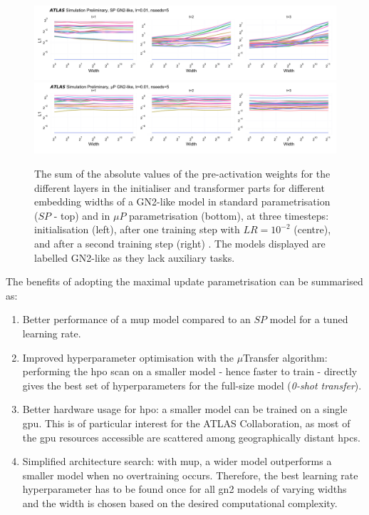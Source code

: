\begin{figure}[h!]
  \centering
  \includegraphics[width=\textwidth]{Images/FTAG/GN/HPO/spweights.png}\\
  \includegraphics[width=\textwidth]{Images/FTAG/GN/HPO/mupweights.png}
  \caption{The sum of the absolute values of the pre-activation weights for the different layers in the initialiser and transformer parts for different embedding widths of a GN2-like model in standard parametrisation ($SP$ - top) and in $\mu P$ parametrisation (bottom), at three timesteps: initialisation (left), after one training step with $LR = 10^{-2}$ (centre), and after a second training step (right) \cite{publicplotMUP}. The models displayed are labelled GN2-like as they lack auxiliary tasks.}
  \label{fig:muspweights}
\end{figure} 
\vspace{-0.3cm}
The benefits of adopting the maximal update parametrisation can be summarised as:
\begin{enumerate}
  \item Better performance of a \gls{mup} model compared to an $SP$ model for a tuned learning rate.
  \item Improved hyperparameter optimisation with the $\mu$Transfer algorithm: performing the \gls{hpo} scan on a smaller model - hence faster to train - directly gives the best set of hyperparameters for the full-size model (\textit{0-shot transfer}). 
  \item Better hardware usage for \gls{hpo}: a smaller model can be trained on a single \gls{gpu}. This is of particular interest for the ATLAS Collaboration, as most of the \gls{gpu} resources accessible are scattered among geographically distant \glspl{hpc}.  
  \item Simplified architecture search: with \gls{mup}, a wider model outperforms a smaller model when no overtraining occurs. Therefore, the best learning rate hyperparameter has to be found once for all \gls{gn2} models of varying widths and the width is chosen based on the desired computational complexity.
\end{enumerate}

